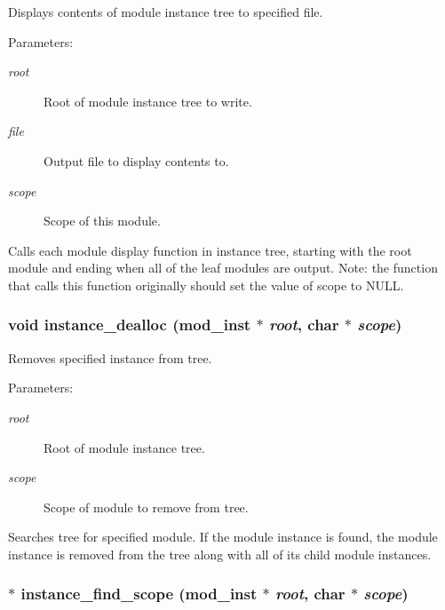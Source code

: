 Displays contents of module instance tree to specified file.

\begin{Desc}
\item[Parameters: ]\par
\begin{description}
\item[{\em 
root}]Root of module instance tree to write. \item[{\em 
file}]Output file to display contents to. \item[{\em 
scope}]Scope of this module.\end{description}
\end{Desc}
Calls each module display function in instance tree, starting with the root module and ending when all of the leaf modules are output. Note: the function that calls this function originally should set the value of scope to NULL. 
\subsubsection{\setlength{\rightskip}{0pt plus 5cm}void instance\_\-dealloc ({\bf mod\_\-inst} $\ast$ {\em root}, char $\ast$ {\em scope})}\label{instance_8h_a3}


Removes specified instance from tree.

\begin{Desc}
\item[Parameters: ]\par
\begin{description}
\item[{\em 
root}]Root of module instance tree. \item[{\em 
scope}]Scope of module to remove from tree.\end{description}
\end{Desc}
Searches tree for specified module. If the module instance is found, the module instance is removed from the tree along with all of its child module instances. 
\subsubsection{$\ast$ instance\_\-find\_\-scope ({\bf mod\_\-inst} $\ast$ {\em root}, char $\ast$ {\em scope})}\label{instance_8h_a0}


